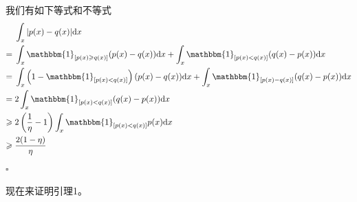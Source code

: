             \begin{Proof}
            我们有如下等式和不等式
            \begin{align*}
            & \int_x|p(x) - q(x)|\mathrm{d}x\\
            ={}&\int_x\mathbbm{1}_{[p(x)\geqslant q(x)]}(p(x)-q(x))\mathrm{d}x+\int_x \mathbbm{1}_{[p(x)<q(x)]}(q(x)-p(x))\mathrm{d}x\\
            ={}& \int_x \left( 1-\mathbbm{1}_{[p(x)<q(x)]} \right) (p(x) - q(x))\mathrm{d}x + \int_x \mathbbm{1}_{[p(x) - q(x)]}(q(x) - p(x))\mathrm{d}x\\
            ={}&2\int_x \mathbbm{1}_{[p(x)<q(x)]}(q(x)-p(x))\mathrm{d}x\\
            \geqslant{}&2 \left( \frac{1}{\eta} - 1 \right) \int_x \mathbbm{1}_{[p(x)<q(x)]}p(x)\mathrm{d}x\\
            \geqslant{}& \frac{2(1-\eta)}{\eta}
            \end{align*}
            $\square$
            \end{Proof}
            \par
            现在来证明引理1。
